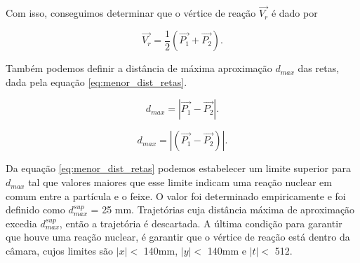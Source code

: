 \documentclass[a4paper,12pt,oneside]{book}
\begin{document}
\par Com isso, conseguimos determinar que o vértice de reação $\vec{V_r}$ é dado por

\begin{equation} \label{eq:vertice_reacao}
    \vec{V_r} = \frac{1}{2}(\vec{P_1} + \vec{P_2}).
\end{equation}

\par Também podemos definir a distância de máxima aproximação $d_{max}$ das retas, dada pela equação \ref{eq:menor_dist_retas}.

\begin{equation} \label{eq:menor_dist_retas}
    d_{max} = \left | \vec{P_1} - \vec{P_2} \right |.
\end{equation}


\begin{equation}
    d_{max} = \left | \left(\vec{P_1} - \vec{P_2}\right) \right |.
\end{equation}

\par Da equação \ref{eq:menor_dist_retas} podemos estabelecer um limite superior para $d_{max}$ tal que valores maiores que esse limite indicam uma reação nuclear em comum entre a partícula e o feixe. O valor foi determinado empiricamente e foi definido como $d_{max}^{sup}$ = 25 mm. Trajetórias cuja distância máxima de aproximação excedia $d_{max}^{sup}$, então a trajetória é descartada. A última condição para garantir que houve uma reação nuclear, é garantir que o vértice de reação está dentro da câmara, cujos limites são $|x| < $ 140mm, $|y| < $ 140mm e $|t| < $ 512.


\end{document}
